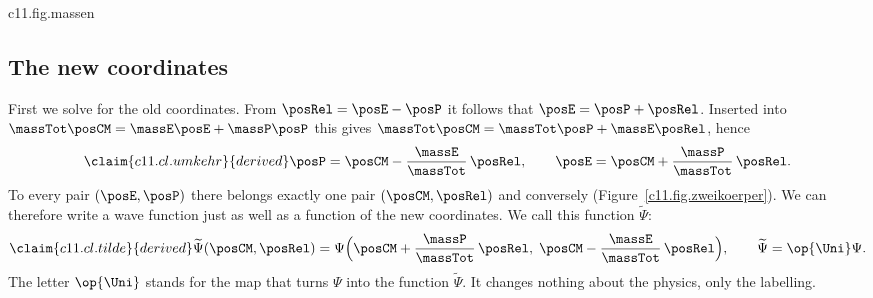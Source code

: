 

\begin{tpcfigure}{c11.fig.massen}
  \caption{Where the centre of mass lies on the segment from the proton to the electron: by  at the distance $(\massE/\massTot)\,\rad$ from the proton. For equal masses this is the middle, for the mass ratio of Figure~\ref{c11.fig.zweikoerper} a quarter of the segment. In the hydrogen atom the proton is so much heavier than the electron that, at the scale of this picture, the centre of mass coincides with the proton.}
\end{tpcfigure}

\subsection{The new coordinates}\label{c11.s2.1}

First we solve for the old coordinates. From $\posRel = \posE - \posP$ it follows that
$\posE = \posP + \posRel$. Inserted into
$\massTot\posCM = \massE\posE + \massP\posP$ this gives
$\massTot\posCM = \massTot\posP + \massE\posRel$, hence
\begin{equation}\label{c11.eq.umkehr}\claim{c11.cl.umkehr}{derived}
  \posP = \posCM - \frac{\massE}{\massTot}\,\posRel,
  \qquad
  \posE = \posCM + \frac{\massP}{\massTot}\,\posRel.
\end{equation}
To every pair $(\posE, \posP)$ there belongs exactly one pair $(\posCM, \posRel)$ and
conversely (Figure~\ref{c11.fig.zweikoerper}). We can therefore write a wave function
just as well as a function of the new coordinates. We call this function
$\widetilde{\Psi}$:
\begin{equation}\label{c11.eq.tilde}\claim{c11.cl.tilde}{derived}
  \widetilde{\Psi}(\posCM, \posRel)
  = \Psi\Bigl(\posCM + \frac{\massP}{\massTot}\,\posRel,\;
              \posCM - \frac{\massE}{\massTot}\,\posRel\Bigr),
  \qquad
  \widetilde{\Psi} = \op{\Uni}\Psi.
\end{equation}
The letter $\op{\Uni}$ stands for the map that turns $\Psi$ into the function
$\widetilde{\Psi}$. It changes nothing about the physics, only the labelling.

